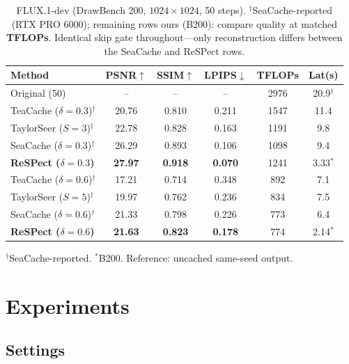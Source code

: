 \documentclass[10pt,twocolumn,letterpaper]{article}
\begin{document}
\begin{table}[t]
  \centering
  \caption{FLUX.1-dev (DrawBench 200, $1024{\times}1024$, 50 steps).
  $^\dagger$SeaCache-reported (RTX PRO 6000); remaining rows ours
  (B200): compare quality at matched \textbf{TFLOPs}. Identical skip
  gate throughout---only reconstruction differs between the SeaCache
  and ReSPect rows.}
  \label{tab:flux}
  \vspace{-0.2cm}
  {\small
  \begin{tabular}{lccccc}
    \toprule
    Method & PSNR$\uparrow$ & SSIM$\uparrow$ & LPIPS$\downarrow$ & TFLOPs & Lat(s) \\
    \midrule
    Original (50) & -- & -- & -- & 2976 & 20.9$^\dagger$ \\
    TeaCache ($\delta{=}0.3$)$^\dagger$ & 20.76 & 0.810 & 0.211 & 1547 & 11.4 \\
    TaylorSeer ($S{=}3$)$^\dagger$ & 22.78 & 0.828 & 0.163 & 1191 & 9.8 \\
    SeaCache ($\delta{=}0.3$)$^\dagger$ & 26.29 & 0.893 & 0.106 & 1098 & 9.4 \\
    \textbf{ReSPect ($\delta{=}0.3$)} & \textbf{27.97} & \textbf{0.918} & \textbf{0.070} & 1241 & 3.33$^*$ \\
    \midrule
    TeaCache ($\delta{=}0.6$)$^\dagger$ & 17.21 & 0.714 & 0.348 & 892 & 7.1 \\
    TaylorSeer ($S{=}5$)$^\dagger$ & 19.97 & 0.762 & 0.236 & 834 & 7.5 \\
    SeaCache ($\delta{=}0.6$)$^\dagger$ & 21.33 & 0.798 & 0.226 & 773 & 6.4 \\
    \textbf{ReSPect ($\delta{=}0.6$)} & \textbf{21.63} & \textbf{0.823} & \textbf{0.178} & 774 & 2.14$^*$ \\
    \bottomrule
  \end{tabular}}
  \vspace{0.1cm}
  {\scriptsize $^\dagger$SeaCache-reported. $^*$B200. Reference: uncached
  same-seed output.}
\end{table}

\section{Experiments}
\label{sec:exp}

\subsection{Settings}
\label{sec:settings}
\end{document}
